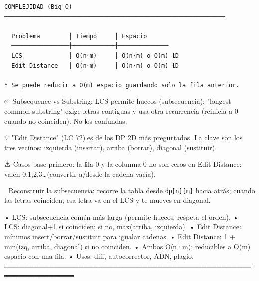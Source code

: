 \begin{lstlisting}
COMPLEJIDAD (Big-O)
──────────────────────────────────────────────────────────────

  Problema        │ Tiempo     │ Espacio
  ────────────────┼────────────┼──────────────
  LCS             │ O(n·m)     │ O(n·m) o O(m) 1D
  Edit Distance   │ O(n·m)     │ O(n·m) o O(m) 1D

* Se puede reducir a O(m) espacio guardando solo la fila anterior.
\end{lstlisting}

\begin{dsaentrevistas}

✅ Subsequence vs Substring: LCS permite huecos (subsecuencia); "longest
   common substring" exige letras contiguas y usa otra recurrencia
   (reinicia a 0 cuando no coinciden). No los confundas.

💡 "Edit Distance" (LC 72) es de los DP 2D más preguntados. La clave son
   los tres vecinos: izquierda (insertar), arriba (borrar), diagonal
   (sustituir).

⚠️ Casos base primero: la fila 0 y la columna 0 no son ceros en Edit
   Distance: valen 0,1,2,3\ldots (convertir a/desde la cadena vacía).

🔑 Reconstruir la subsecuencia: recorre la tabla desde \verb|dp[n][m]|
   hacia atrás; cuando las letras coinciden, esa letra va en el LCS y te
   mueves en diagonal.

\end{dsaentrevistas}

\begin{dsaresumen}

• LCS: subsecuencia común más larga (permite huecos, respeta el orden).
• LCS: diagonal+1 si coinciden; si no, max(arriba, izquierda).
• Edit Distance: mínimos insert/borrar/sustituir para igualar cadenas.
• Edit Distance: 1 + min(izq, arriba, diagonal) si no coinciden.
• Ambos O(n·m); reducibles a O(m) espacio con una fila.
• Usos: diff, autocorrector, ADN, plagio.
════════════════════════════════════════════════════════════════

\end{dsaresumen}
